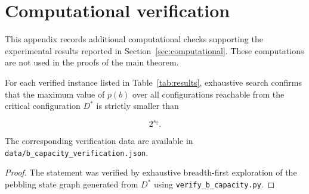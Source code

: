 
\appendix

\section{Computational verification}
\label{sec:appendix-computational}


This appendix records additional computational checks supporting the
experimental results reported in Section~\ref{sec:computational}. These
computations are not used in the proofs of the main theorem.


\begin{proposition}
\label{prop:b-capacity-computational}

For each verified instance listed in Table~\ref{tab:results}, exhaustive
search confirms that the maximum value of $p(b)$ over all configurations
reachable from the critical configuration $D^*$ is strictly smaller than

\[
2^{s_2}.
\]

The corresponding verification data are available in
\texttt{data/b\_capacity\_verification.json}.

\end{proposition}


\begin{proof}

The statement was verified by exhaustive breadth-first exploration of the
pebbling state graph generated from $D^*$ using
\texttt{verify\_b\_capacity.py}.

\end{proof}



